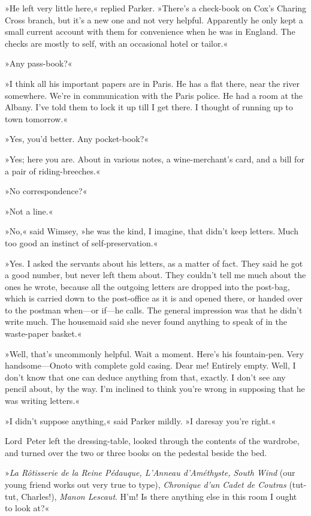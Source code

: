 »He left very little here,« replied Parker. »There's a check-book on Cox's Charing Cross branch, but it's a new one and not very helpful. Apparently he only kept a small current account with them for convenience when he was in England. The checks are mostly to self, with an occasional hotel or tailor.«

»Any pass-book?«

»I think all his important papers are in Paris. He has a flat there, near the river somewhere. We're in communication with the Paris police. He had a room at the Albany. I've told them to lock it up till I get there. I thought of running up to town tomorrow.«

»Yes, you'd better. Any pocket-book?«

»Yes; here you are. About  in various notes, a wine-merchant's card, and a bill for a pair of riding-breeches.«

»No correspondence?«

»Not a line.«

»No,« said Wimsey, »he was the kind, I imagine, that didn't keep letters. Much too good an instinct of self-preservation.«

»Yes. I asked the servants about his letters, as a matter of fact. They said he got a good number, but never left them about. They couldn't tell me much about the ones he wrote, because all the outgoing letters are dropped into the post-bag, which is carried down to the post-office as it is and opened there, or handed over to the postman when—or if—he calls. The general impression was that he didn't write much. The housemaid said she never found anything to speak of in the waste-paper basket.«

»Well, that's uncommonly helpful. Wait a moment. Here's his fountain-pen. Very handsome—Onoto with complete gold casing. Dear me! Entirely empty. Well, I don't know that one can deduce anything from that, exactly. I don't see any pencil about, by the way. I'm inclined to think you're wrong in supposing that he was writing letters.«

»I didn't suppose anything,« said Parker mildly. »I daresay you're right.«

Lord~Peter left the dressing-table, looked through the contents of the wardrobe, and turned over the two or three books on the pedestal beside the bed.

»\foreignlanguage{french}{\textit{La Rôtisserie de la Reine Pédauque, L'Anneau d'Améthyste, South Wind}} (our young friend works out very true to type), \foreignlanguage{french}{\textit{Chronique d'un Cadet de Coutras}} (tut-tut, Charles!), \textit{Manon Lescaut}. H'm! Is there anything else in this room I ought to look at?«

